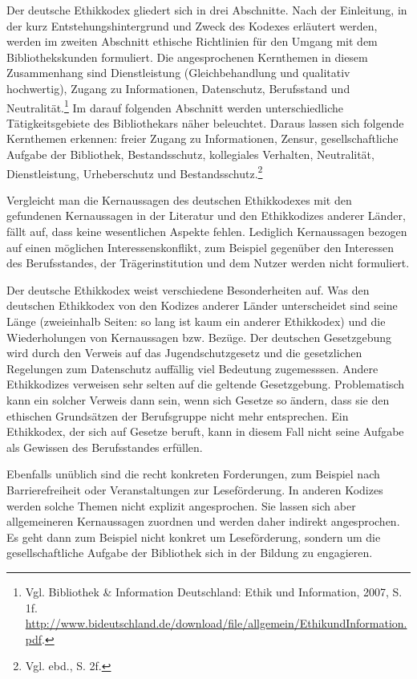 \documentclass[output=paper]{langscibook}
\begin{document}
Der deutsche Ethikkodex gliedert sich in drei Abschnitte. Nach der
Einleitung, in der kurz Entstehungshintergrund und Zweck des Kodexes
erläutert werden, werden im zweiten Abschnitt ethische Richtlinien für
den Umgang mit dem Bibliothekskunden formuliert. Die angesprochenen
Kernthemen in diesem Zusammenhang sind Dienstleistung (Gleichbehandlung
und qualitativ hochwertig), Zugang zu Informationen, Datenschutz,
Berufsstand und Neutralität.\footnote{Vgl. Bibliothek \& Information
  Deutschland: Ethik und Information, 2007, S. 1f.
  \url{http://www.bideutschland.de/download/file/allgemein/EthikundInformation.pdf}.}
Im darauf folgenden Abschnitt werden unterschiedliche Tätigkeitsgebiete
des Bibliothekars näher beleuchtet. Daraus lassen sich folgende
Kernthemen erkennen: freier Zugang zu Informationen, Zensur,
gesellschaftliche Aufgabe der Bibliothek, Bestandsschutz, kollegiales
Verhalten, Neutralität, Dienstleistung, Urheberschutz und
Bestandsschutz.\footnote{Vgl. ebd., S. 2f.}

Vergleicht man die Kernaussagen des deutschen Ethikkodexes mit den
gefundenen Kernaussagen in der Literatur und den Ethikkodizes anderer
Länder, fällt auf, dass keine wesentlichen Aspekte fehlen. Lediglich
Kernaussagen bezogen auf einen möglichen Interessenskonflikt, zum
Beispiel gegenüber den Interessen des Berufsstandes, der
Trägerinstitution und dem Nutzer werden nicht formuliert.

Der deutsche Ethikkodex weist verschiedene Besonderheiten auf. Was den
deutschen Ethikkodex von den Kodizes anderer Länder unterscheidet sind
seine Länge (zweieinhalb Seiten: so lang ist kaum ein anderer
Ethikkodex) und die Wiederholungen von Kernaussagen bzw. Bezüge. Der
deutschen Gesetzgebung wird durch den Verweis auf das Jugendschutzgesetz
und die gesetzlichen Regelungen zum Datenschutz auffällig viel Bedeutung
zugemesssen. Andere Ethikkodizes verweisen sehr selten auf die geltende
Gesetzgebung. Problematisch kann ein solcher Verweis dann sein, wenn
sich Gesetze so ändern, dass sie den ethischen Grundsätzen der
Berufsgruppe nicht mehr entsprechen. Ein Ethikkodex, der sich auf
Gesetze beruft, kann in diesem Fall nicht seine Aufgabe als Gewissen des
Berufsstandes erfüllen.

Ebenfalls unüblich sind die recht konkreten Forderungen, zum Beispiel
nach Barrierefreiheit oder Veranstaltungen zur Leseförderung. In anderen
Kodizes werden solche Themen nicht explizit angesprochen. Sie lassen
sich aber allgemeineren Kernaussagen zuordnen und werden daher indirekt
angesprochen. Es geht dann zum Beispiel nicht konkret um Leseförderung,
sondern um die gesellschaftliche Aufgabe der Bibliothek sich in der
Bildung zu engagieren.
\end{document}
